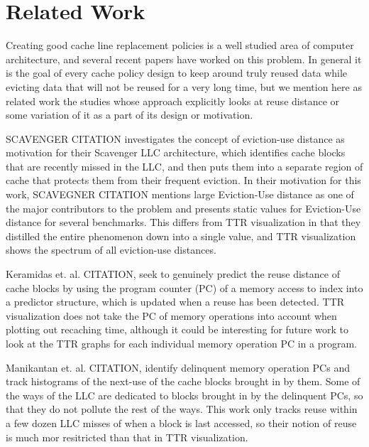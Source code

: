 \section{Related Work}

Creating good cache line replacement policies is a well
studied area of computer architecture, and several recent papers have
worked on this problem.  In general it is the goal of every cache
policy design to keep around truly reused data while evicting data
that will not be reused for a very long time, but we mention here as
related work the
studies whose approach explicitly looks at reuse distance or some
variation of it as a part of its design or motivation.

SCAVENGER CITATION investigates the concept of eviction-use distance
as motivation for their Scavenger LLC architecture, which identifies
cache blocks that are recently missed in the LLC, and then puts them
into a separate region of cache that protects them from their frequent
eviction.  In their motivation for this work, SCAVEGNER CITATION
mentions large Eviction-Use distance as one of the major contributors
to the problem and presents static values for Eviction-Use distance
for several benchmarks.  This differs from TTR visualization in that
they distilled the entire phenomenon down into a single value, and
TTR visualization shows the spectrum of all eviction-use distances.

Keramidas et. al. CITATION, seek to genuinely predict the reuse
distance of cache blocks by using the program counter (PC) of a memory
access to index into a predictor structure, which is updated when a
reuse has been detected.  TTR visualization does not take the PC of
memory operations into account when plotting out recaching time,
although it could be interesting for future work to look at the TTR
graphs for each individual memory operation PC in a program.

Manikantan et. al. CITATION, identify delinquent memory operation PCs and track
histograms of the next-use of the cache blocks brought in by them.
Some of the ways of the LLC are dedicated to blocks brought in by the
delinquent PCs, so that they do not pollute the rest of the ways.
This work only tracks reuse within a few dozen LLC misses of when a
block is last accessed, so their notion of reuse is much mor
resitricted than that in TTR visualization.

